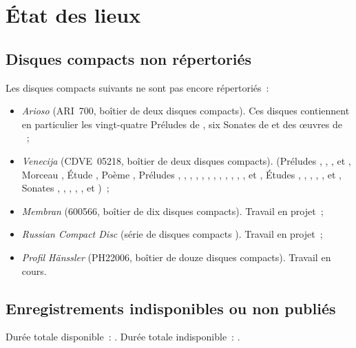 \chapter[%
État des lieux][%
État des lieux]{%
État des lieux}
\label{chap:Etat-des-lieux}

\section{Disques compacts non répertoriés}
\label{sec:Nonrepertorie}

Les disques compacts suivants ne sont pas encore répertoriés~:
\begin{itemize}
 \item
 \emph{Arioso} (ARI~700, boîtier de deux disques compacts).
 Ces disques contiennent en particulier les vingt-quatre Préludes 
 de \Chopin{}, six Sonates de \Scriabine{} et des œuvres de \Liadov{}~;
 \item
 \emph{Venecija} (CDVE~05218, boîtier de deux disques compacts).
 \Scriabine{} (Préludes  ,  ,
  ,   et  ,
 Morceau  , Étude  , Poème 
 , Préludes  ,  , 
 ,  ,  , 
 ,  ,  , 
 ,  ,  , 
 ,   et  , Études
  ,  ,  , 
 ,  ,   et 
 , Sonates , , , , ,
  et )~;
 \item
 \emph{Membran} (600566, boîtier de dix disques compacts).
 Travail en projet~;
 \item
 \emph{Russian Compact Disc} (série de disques compacts ).
 Travail en projet~;
 \item
 \emph{Profil Hänssler} (PH22006, boîtier de douze disques compacts).
 Travail en cours.
\end{itemize}

\section{Enregistrements indisponibles ou non publiés}
\label{sec:IndisponibleNonpublie}

Durée totale disponible~: \availabletotaltime.
Durée totale indisponible~: \unavailabletotaltime.

